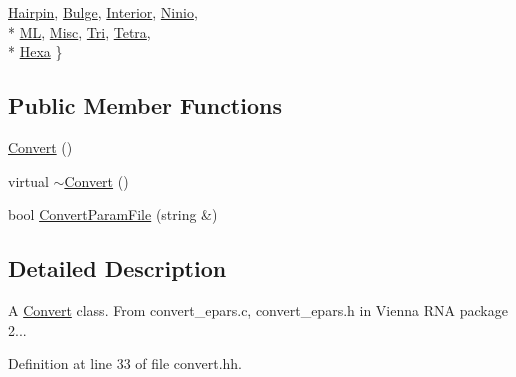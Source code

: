 \begin{DoxyCompactItemize}
\hyperlink{class_rfold_1_1_parameter_1_1_convert_a65137d7d6c3c2c5e4707db094885aa5fa68206a15b95dfa107743ef8eea137876}{Hairpin}, 
\hyperlink{class_rfold_1_1_parameter_1_1_convert_a65137d7d6c3c2c5e4707db094885aa5fa27dcdd916dcb147198859bafe0e230c9}{Bulge}, 
\hyperlink{class_rfold_1_1_parameter_1_1_convert_a65137d7d6c3c2c5e4707db094885aa5fada9ebc32acc20f1881023011286bf9d1}{Interior}, 
\hyperlink{class_rfold_1_1_parameter_1_1_convert_a65137d7d6c3c2c5e4707db094885aa5fab5c4d9b284512c14555f6ff664ab640f}{Ninio}, 
\\*
\hyperlink{class_rfold_1_1_parameter_1_1_convert_a65137d7d6c3c2c5e4707db094885aa5fada44c0cffa1606e68265f2def5137b64}{M\+L}, 
\hyperlink{class_rfold_1_1_parameter_1_1_convert_a65137d7d6c3c2c5e4707db094885aa5faf1b18690c9754ede42e7f0ed9d0b3f88}{Misc}, 
\hyperlink{class_rfold_1_1_parameter_1_1_convert_a65137d7d6c3c2c5e4707db094885aa5fa254ee2be04fe8dc9c1044f28d56a4a7e}{Tri}, 
\hyperlink{class_rfold_1_1_parameter_1_1_convert_a65137d7d6c3c2c5e4707db094885aa5fa7e88ac8e127b70c44052f2af006fdd64}{Tetra}, 
\\*
\hyperlink{class_rfold_1_1_parameter_1_1_convert_a65137d7d6c3c2c5e4707db094885aa5faac868a2c5f4d7f2ddebde3e2192da070}{Hexa}
 \}
\end{DoxyCompactItemize}
\subsection*{Public Member Functions}
\begin{DoxyCompactItemize}
\item 
\hyperlink{class_rfold_1_1_parameter_1_1_convert_a52199a92c29fc27444e7bbe97cbaf371}{Convert} ()
\item 
virtual \hyperlink{class_rfold_1_1_parameter_1_1_convert_afdcd19841c255de825d61bdb2c806443}{$\sim$\+Convert} ()
\item 
bool \hyperlink{class_rfold_1_1_parameter_1_1_convert_ab50e43100375c5e462f81f90433a6fef}{Convert\+Param\+File} (string \&)
\end{DoxyCompactItemize}


\subsection{Detailed Description}
A \hyperlink{class_rfold_1_1_parameter_1_1_convert}{Convert} class. From convert\+\_\+epars.\+c, convert\+\_\+epars.\+h in Vienna R\+N\+A package 2... 

Definition at line 33 of file convert.\+hh.



